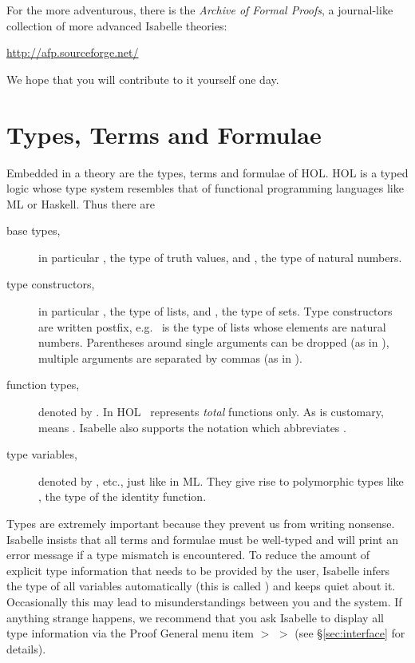 For the more adventurous, there is the \emph{Archive of Formal Proofs},
a journal-like collection of more advanced Isabelle theories:
\begin{center}\small
    \url{http://afp.sourceforge.net/}
\end{center}
We hope that you will contribute to it yourself one day.%


\section{Types, Terms and Formulae}
\label{sec:TypesTermsForms}

Embedded in a theory are the types, terms and formulae of HOL\@. HOL is a typed
logic whose type system resembles that of functional programming languages
like ML or Haskell. Thus there are
\begin{description}
\item[base types,] 
in particular , the type of truth values,
and , the type of natural numbers.
\item[type constructors,]
 in particular , the type of
lists, and , the type of sets. Type constructors are written
postfix, e.g.\  is the type of lists whose elements are
natural numbers. Parentheses around single arguments can be dropped (as in
), multiple arguments are separated by commas (as in
).
\item[function types,]
denoted by \isasymFun{}.
  In HOL \isasymFun\ represents \emph{total} functions only. As is customary,
   means
  . Isabelle also
  supports the notation 
  which abbreviates .
\item[type variables,]
  denoted by ,  etc., just like in ML\@. They give rise
  to polymorphic types like , the type of the identity
  function.
\end{description}
\begin{warn}
  Types are extremely important because they prevent us from writing
  nonsense.  Isabelle insists that all terms and formulae must be
  well-typed and will print an error message if a type mismatch is
  encountered. To reduce the amount of explicit type information that
  needs to be provided by the user, Isabelle infers the type of all
  variables automatically (this is called )
  and keeps quiet about it. Occasionally this may lead to
  misunderstandings between you and the system. If anything strange
  happens, we recommend that you ask Isabelle to display all type
  information via the Proof General menu item  $>$
   $>$  (see \S\ref{sec:interface}
  for details).
\end{warn}%


